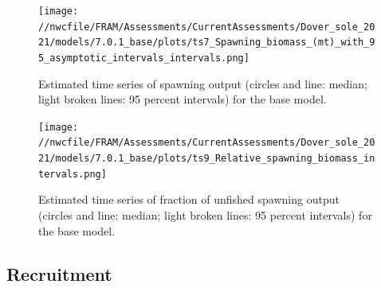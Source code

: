 \documentclass[11pt,
  english,
  a4paper,
]{article}
\begin{document}
\leavevmode\tagmcend\tagstructend\par




\begin{figure}
\centering
\texttt{[image: //nwcfile/FRAM/Assessments/CurrentAssessments/Dover\_sole\_2021/models/7.0.1\_base/plots/ts7\_Spawning\_biomass\_(mt)\_with\_95\_asymptotic\_intervals\_intervals.png]}
\caption{Estimated time series of spawning output (circles and line: median; light broken lines: 95 percent intervals) for the base model.\label{fig:es-ssb}}
\end{figure}

\tagmcend\tagstructend


\begin{figure}
\centering
\texttt{[image: //nwcfile/FRAM/Assessments/CurrentAssessments/Dover\_sole\_2021/models/7.0.1\_base/plots/ts9\_Relative\_spawning\_biomass\_intervals.png]}
\caption{Estimated time series of fraction of unfished spawning output (circles and line: median; light broken lines: 95 percent intervals) for the base model.\label{fig:es-depl}}
\end{figure}

\tagmcend\tagstructend

\clearpage


\hypertarget{recruitment}{%
\subsection*{Recruitment}\label{recruitment}}

\leavevmode\tagmcend\tagstructend

\end{document}
